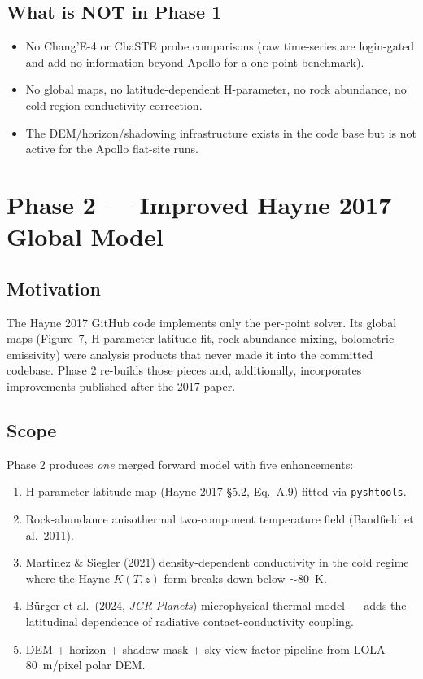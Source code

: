 \documentclass[11pt,a4paper]{book}
\begin{document}
\section{What is NOT in Phase 1}
\begin{itemize}
\item No Chang'E-4 or ChaSTE probe comparisons (raw time-series are login-gated and add no information beyond Apollo for a one-point benchmark).
\item No global maps, no latitude-dependent H-parameter, no rock abundance, no cold-region conductivity correction.
\item The DEM/horizon/shadowing infrastructure exists in the code base but is not active for the Apollo flat-site runs.
\end{itemize}

\chapter{Phase 2 --- Improved Hayne 2017 Global Model}
\section{Motivation}
The Hayne 2017 GitHub code implements only the per-point solver. Its
global maps (Figure~7, H-parameter latitude fit, rock-abundance
mixing, bolometric emissivity) were analysis products that never made
it into the committed codebase. Phase 2 re-builds those pieces and,
additionally, incorporates improvements published after the 2017 paper.

\section{Scope}
Phase 2 produces \emph{one} merged forward model with five
enhancements:
\begin{enumerate}[label=(\roman*)]
\item H-parameter latitude map (Hayne 2017 \S 5.2, Eq.~A.9) fitted via \texttt{pyshtools}.
\item Rock-abundance anisothermal two-component temperature field (Bandfield et al.\ 2011).
\item Martinez \& Siegler (2021) density-dependent conductivity in the cold regime where the Hayne $K(T,z)$ form breaks down below $\sim 80$~K.
\item B\"urger et al.\ (2024, \emph{JGR Planets}) microphysical thermal model --- adds the latitudinal dependence of radiative contact-conductivity coupling.
\item DEM + horizon + shadow-mask + sky-view-factor pipeline from LOLA 80~m/pixel polar DEM.
\end{enumerate}
\end{document}
